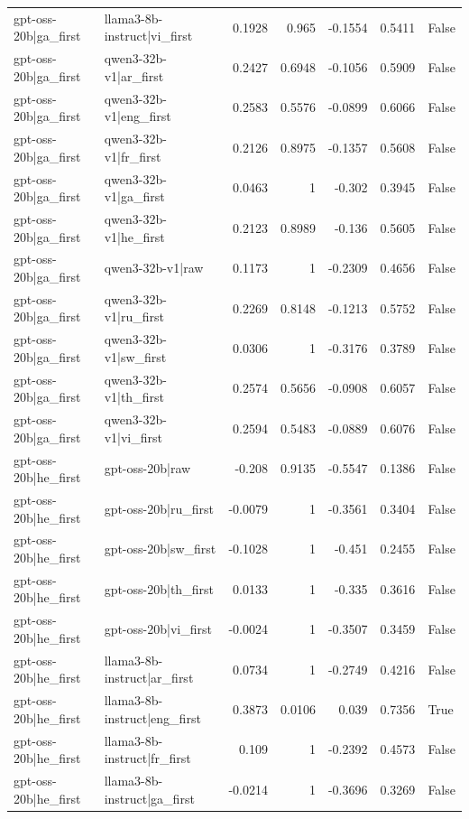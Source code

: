 \begin{table}
\begin{tabular}{l l r r r r l}
gpt-oss-20b|ga_first & llama3-8b-instruct|vi_first & 0.1928 & 0.965 & -0.1554 & 0.5411 & False \\
gpt-oss-20b|ga_first & qwen3-32b-v1|ar_first & 0.2427 & 0.6948 & -0.1056 & 0.5909 & False \\
gpt-oss-20b|ga_first & qwen3-32b-v1|eng_first & 0.2583 & 0.5576 & -0.0899 & 0.6066 & False \\
gpt-oss-20b|ga_first & qwen3-32b-v1|fr_first & 0.2126 & 0.8975 & -0.1357 & 0.5608 & False \\
gpt-oss-20b|ga_first & qwen3-32b-v1|ga_first & 0.0463 & 1 & -0.302 & 0.3945 & False \\
gpt-oss-20b|ga_first & qwen3-32b-v1|he_first & 0.2123 & 0.8989 & -0.136 & 0.5605 & False \\
gpt-oss-20b|ga_first & qwen3-32b-v1|raw & 0.1173 & 1 & -0.2309 & 0.4656 & False \\
gpt-oss-20b|ga_first & qwen3-32b-v1|ru_first & 0.2269 & 0.8148 & -0.1213 & 0.5752 & False \\
gpt-oss-20b|ga_first & qwen3-32b-v1|sw_first & 0.0306 & 1 & -0.3176 & 0.3789 & False \\
gpt-oss-20b|ga_first & qwen3-32b-v1|th_first & 0.2574 & 0.5656 & -0.0908 & 0.6057 & False \\
gpt-oss-20b|ga_first & qwen3-32b-v1|vi_first & 0.2594 & 0.5483 & -0.0889 & 0.6076 & False \\
gpt-oss-20b|he_first & gpt-oss-20b|raw & -0.208 & 0.9135 & -0.5547 & 0.1386 & False \\
gpt-oss-20b|he_first & gpt-oss-20b|ru_first & -0.0079 & 1 & -0.3561 & 0.3404 & False \\
gpt-oss-20b|he_first & gpt-oss-20b|sw_first & -0.1028 & 1 & -0.451 & 0.2455 & False \\
gpt-oss-20b|he_first & gpt-oss-20b|th_first & 0.0133 & 1 & -0.335 & 0.3616 & False \\
gpt-oss-20b|he_first & gpt-oss-20b|vi_first & -0.0024 & 1 & -0.3507 & 0.3459 & False \\
gpt-oss-20b|he_first & llama3-8b-instruct|ar_first & 0.0734 & 1 & -0.2749 & 0.4216 & False \\
gpt-oss-20b|he_first & llama3-8b-instruct|eng_first & 0.3873 & 0.0106 & 0.039 & 0.7356 & True \\
gpt-oss-20b|he_first & llama3-8b-instruct|fr_first & 0.109 & 1 & -0.2392 & 0.4573 & False \\
gpt-oss-20b|he_first & llama3-8b-instruct|ga_first & -0.0214 & 1 & -0.3696 & 0.3269 & False \\

\end{tabular}
\end{table}
